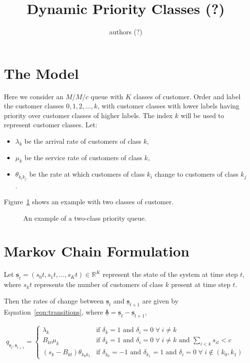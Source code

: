 \documentclass{article}
\title{Dynamic Priority Classes (?)}
\author{authors (?)}
\date{}
\begin{document}
\maketitle

\section{The Model}
Here we consider an $M/M/c$ queue with $K$ classes of customer.
Order and label the customer classes $0, 1, 2, \dots, k$, with customer classes
with lower labels having priority over customer classes of higher labels.
The index $k$ will be used to represent customer classes.
Let:

\begin{itemize}
  \item $\lambda_k$ be the arrival rate of customers of class $k$,
  \item $\mu_k$ be the service rate of customers of class $k$,
  \item $\theta_{k_ik_j}$ be the rate at which customers of class $k_i$ change
  to customers of class $k_j$.
\end{itemize}

Figure~\ref{fig:twoclass_example} shows an example with two classes of customer.

\begin{figure}
\begin{center}

\end{center}
\caption{An example of a two-class priority queue.}
\label{fig:twoclass_example}
\end{figure}


\section{Markov Chain Formulation}
Let $\underline{\mathbf{s}}_t = (s_0t, s_1t, \dots, s_Kt) \in \mathbb{R}^K$
represent the state of the system at time step $t$, where $s_kt$ represents the
number of customers of class $k$ present at time step $t$.

Then the rates of change between $\underline{\mathbf{s}}_t$ and
$\underline{\mathbf{s}}_{t+1}$ are given by Equation~\ref{eqn:transitions},
where $\underline{\mathbf{\delta}} = \underline{\mathbf{s}}_t - \underline{\mathbf{s}}_{t+1}$,

\begin{equation}\label{eqn:transitions}
q_{\underline{\mathbf{s}}_t, \underline{\mathbf{s}}_{t+1}} = 
\begin{cases}
\lambda_k & \text{if } \delta_k = 1 \text{ and } \delta_i = 0 \; \forall \; i \neq k \\
B_{kt} \mu_k & \text{if } \delta_k = 1 \text{ and } \delta_i = 0 \; \forall \; i \neq k \text{ and } \sum_{i < k} s_{it} < c \\
(s_k - B_{kt}) \theta_{k_0k_1} & \text{if } \delta_{k_0} = -1 \text{ and } \delta_{k_1} = 1 \text{ and } \delta_i = 0 \; \forall \; i \notin (k_0, k_1)
\end{cases}
\end{equation}
\end{document}
